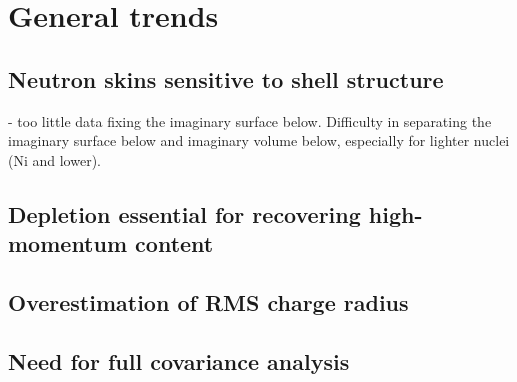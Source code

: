 \section{General trends}
\subsection{Neutron skins sensitive to shell structure}
- too little data fixing the imaginary surface below. Difficulty in separating the imaginary surface
below and imaginary volume below, especially for lighter nuclei (Ni and lower).
\subsection{Depletion essential for recovering high-momentum content}
\subsection{Overestimation of RMS charge radius}
\subsection{Need for full covariance analysis}

\afterpage{\clearpage}
